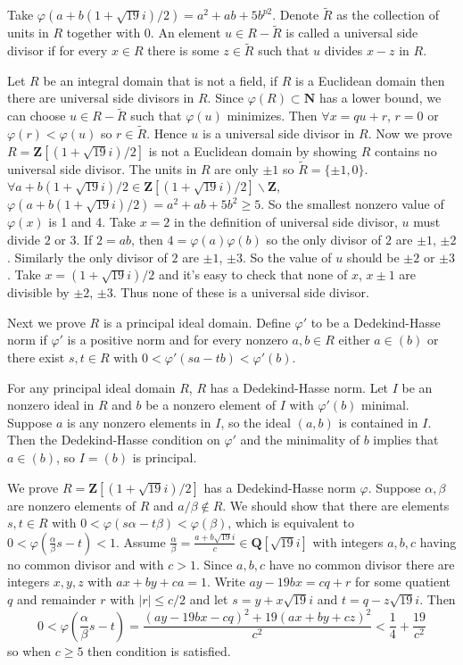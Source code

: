 \begin{answer}
    Take $\varphi(a+b(1+\sqrt{19}i) /2)=a^{2}+ab+5b^{p2}$. Denote $\tilde{R}$ as the collection of units in $R$ together with 0. An element $u\in R-\tilde{R}$ is called a universal side divisor if for every $x\in R$ there is some $z\in \tilde{R}$ such that $u$ divides $x-z$ in $R$.
    
    Let $R$ be an integral domain that is not a field, if $R$ is a Euclidean domain then there are universal side divisors in $R$. Since $\varphi(R)\subset \mathbf{N}$ has a lower bound, we can choose $u\in R-\tilde{R}$ such that $\varphi(u)$ minimizes. Then $\forall x=qu+r$, $r=0$ or $\varphi(r)<\varphi(u)$ so $r\in \tilde{R}$. Hence $u$ is a universal side divisor in $R$. Now we prove $R=\mathbf{Z}[(1+\sqrt{19}i) /2]$ is not a Euclidean domain by showing $R$ contains no universal side divisor. The units in $R$ are only $\pm 1$ so $\tilde{R}=\{\pm 1,0\}$. $\forall a+b(1+\sqrt{19}i) /2\in \mathbf{Z}[(1+\sqrt{19}i) /2]\backslash \mathbf{Z}$, $\varphi(a+b(1+\sqrt{19}i) /2)=a^{2}+ab+5b^{2}\geq 5$. So the smallest nonzero value of $\varphi(x)$ is 1 and 4. Take $x=2$ in the definition of universal side divisor, $u$ must divide $2$ or $3$. If $2=ab$, then $4=\varphi(a)\varphi(b)$ so the only divisor of $2$ are $\pm 1$, $\pm 2$. Similarly the only divisor of $2$ are $\pm 1$, $\pm 3$. So the value of $u$ should be $\pm 2$ or $\pm 3$. Take $x=(1+\sqrt{19}i) /2$ and it's easy to check that none of $x$, $x\pm 1$ are divisible by $\pm 2$, $\pm 3$. Thus none of these is a universal side divisor.

    Next we prove $R$ is a principal ideal domain. Define $\varphi'$ to be a Dedekind-Hasse norm if $\varphi'$ is a positive norm and for every nonzero $a,b\in R$ either $a\in (b)$ or there exist $s,t\in R$ with $0<\varphi'(sa-tb)<\varphi'(b)$. 
    
    For any principal ideal domain $R$, $R$ has a Dedekind-Hasse norm. Let $I$ be an nonzero ideal in $R$ and $b$ be a nonzero element of $I$ with $\varphi'(b)$ minimal. Suppose $a$ is any nonzero elements in $I$, so the ideal $(a,b)$ is contained in $I$. Then the Dedekind-Hasse condition on $\varphi'$ and the minimality of $b$ implies that $a\in (b)$, so $I=(b)$ is principal.

    We prove $R=\mathbf{Z}[(1+\sqrt{19}i) /2]$ has a Dedekind-Hasse norm $\varphi$. Suppose $\alpha, \beta$ are nonzero elements of $R$ and $a /\beta\notin R$. We should show that there are elements $s,t\in R$ with $0<\varphi(s\alpha-t\beta)<\varphi(\beta)$, which is equivalent to $0<\varphi(\frac{\alpha}{\beta}s-t)<1$. Assume $\frac{\alpha}{\beta}=\frac{a+b\sqrt{19}i}{c}\in\mathbf{Q}[\sqrt{19}i]$ with integers $a,b,c$ having no common divisor and with $c>1$. Since $a,b,c$ have no common divisor there are integers $x,y,z$ with $ax+by+ca=1$. Write $ay-19bx=cq+r$ for some quatient $q$ and remainder $r$ with $\left| r  \right|\leq c/2 $ and let $s=y+x\sqrt{19}i$ and $t=q-z\sqrt{19}i$. Then \[0<\varphi(\frac{\alpha}{\beta}s-t)=\frac{(ay-19bx-cq)^{2}+19(ax+by+cz)^{2}}{c^{2}}<\frac{1}{4}+\frac{19}{c^{2}}\] so when $c\geq 5$ then condition is satisfied.
    

\end{answer}
